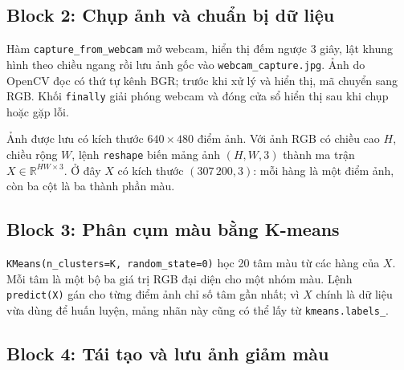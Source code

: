 \subsection{Block 2: Chụp ảnh và chuẩn bị dữ liệu}

Hàm \texttt{capture\_from\_webcam} mở webcam, hiển thị đếm ngược 3 giây,
lật khung hình theo chiều ngang rồi lưu ảnh gốc vào
\texttt{webcam\_capture.jpg}. Ảnh do OpenCV đọc có thứ tự kênh BGR; trước
khi xử lý và hiển thị, mã chuyển sang RGB. Khối \texttt{finally} giải phóng
webcam và đóng cửa sổ hiển thị sau khi chụp hoặc gặp lỗi.





Ảnh được lưu có kích thước
$640\times480$ điểm ảnh. Với ảnh RGB có chiều cao $H$, chiều rộng $W$,
lệnh \texttt{reshape} biến mảng ảnh $(H,W,3)$ thành ma trận
$X\in\mathbb{R}^{HW\times3}$. Ở đây $X$ có kích thước $(307\,200,3)$:
mỗi hàng là một điểm ảnh, còn ba cột là ba thành phần màu.



\subsection{Block 3: Phân cụm màu bằng K-means}

\texttt{KMeans(n\_clusters=K, random\_state=0)} học 20 tâm màu từ các
hàng của $X$. Mỗi tâm là một bộ ba giá trị RGB đại diện cho một nhóm màu.
Lệnh \texttt{predict(X)} gán cho từng điểm ảnh chỉ số tâm gần nhất; vì $X$
chính là dữ liệu vừa dùng để huấn luyện, mảng nhãn này cũng có thể lấy từ
\texttt{kmeans.labels\_}.



\subsection{Block 4: Tái tạo và lưu ảnh giảm màu}

